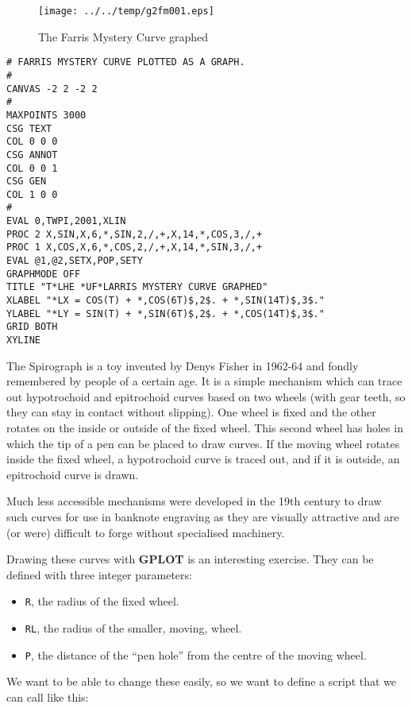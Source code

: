 \documentclass[a4paper,twoside,11pt]{article}
\makeatletter
\def\maxwidth{%
  \ifdim\Gin@nat@width>\linewidth
    \linewidth
  \else
    \Gin@nat@width
  \fi
}
\newcommand{\newpara}{\par\vspace{4mm}\noindent}
\makeatother
\begin{document}
\begin{figure}
  \centering
  \texttt{[image: ../../temp/g2fm001.eps]}
  \caption{The Farris Mystery Curve graphed}
  \label{fig:g2fm001}
\end{figure}

\begin{lstlisting}
# FARRIS MYSTERY CURVE PLOTTED AS A GRAPH.
#
CANVAS -2 2 -2 2
#
MAXPOINTS 3000
CSG TEXT
COL 0 0 0
CSG ANNOT
COL 0 0 1
CSG GEN
COL 1 0 0
#
EVAL 0,TWPI,2001,XLIN
PROC 2 X,SIN,X,6,*,SIN,2,/,+,X,14,*,COS,3,/,+
PROC 1 X,COS,X,6,*,COS,2,/,+,X,14,*,SIN,3,/,+
EVAL @1,@2,SETX,POP,SETY
GRAPHMODE OFF
TITLE "T*LHE *UF*LARRIS MYSTERY CURVE GRAPHED"
XLABEL "*LX = COS(T) + *,COS(6T)$,2$. + *,SIN(14T)$,3$."
YLABEL "*LY = SIN(T) + *,SIN(6T)$,2$. + *,COS(14T)$,3$."
GRID BOTH
XYLINE
\end{lstlisting}

\newpara
The Spirograph is a toy invented by Denys Fisher in 1962-64 and fondly
remembered by people of a certain age. It is a simple mechanism which
can trace out hypotrochoid and epitrochoid curves based on two wheels
(with gear teeth, so they can stay in contact without slipping). One
wheel is fixed and the other rotates on the inside or outside of the
fixed wheel. This second wheel has holes in which the tip of a pen can
be placed to draw curves. If the moving wheel rotates inside the fixed
wheel, a hypotrochoid curve is traced out, and if it is outside, an
epitrochoid curve is drawn.

\newpara
Much less accessible mechanisms were developed in the 19th century to
draw such curves for use in banknote engraving as they are visually
attractive and are (or were) difficult to forge without specialised
machinery.

\newpara
Drawing these curves with \textbf{GPLOT} is an interesting exercise. They can be
defined with three integer parameters:

\begin{itemize}
\item
  \texttt{R}, the radius of the fixed wheel.
\item
  \texttt{RL}, the radius of the smaller, moving, wheel.
\item
  \texttt{P}, the distance of the ``pen hole'' from the centre of the
  moving wheel.
\end{itemize}

\newpara
We want to be able to change these easily, so we want to define a script
that we can call like this:
\end{document}

